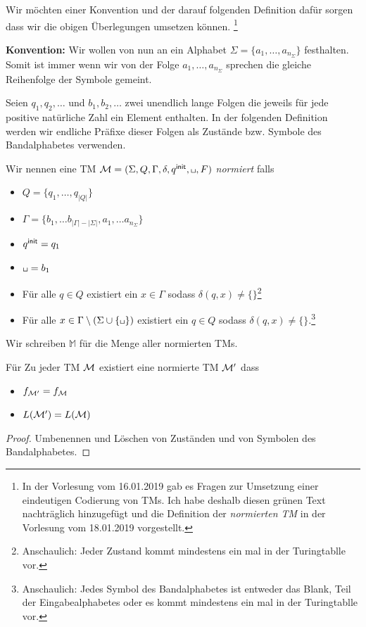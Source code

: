 {\color{green!50!black}
	Wir möchten einer Konvention und der darauf folgenden Definition dafür sorgen dass wir die obigen Überlegungen umsetzen können.
	\footnote{In der Vorlesung vom 16.01.2019 gab es Fragen zur Umsetzung einer eindeutigen Codierung von \acp{TM}.
		Ich habe deshalb diesen grünen Text nachträglich hinzugefügt und die Definition der \emph{normierten \ac{TM}} in der Vorlesung vom 18.01.2019 vorgestellt.}
	
	\textbf{Konvention: } 
	Wir wollen von nun an ein Alphabet $\Sigma=\{a_1,\ldots, a_{n_\Sigma}\}$ festhalten.
	Somit ist immer wenn wir von der Folge $a_1,\ldots, a_{n_\Sigma}$ sprechen die gleiche Reihenfolge der Symbole gemeint.
	
	
	Seien $q_1,q_2,\ldots$ und $b_1,b_2,\ldots$ zwei unendlich lange Folgen die jeweils für jede positive natürliche Zahl ein Element enthalten.
	In der folgenden Definition werden wir endliche Präfixe dieser Folgen als Zustände bzw. Symbole des Bandalphabetes verwenden.
	
	\begin{Def}[name={[normierte \ac{TM}]}]\label{def:normTM}
		Wir nennen eine \ac{TM} $\M=(\Sigma, Q, \Gamma, \delta, \qinit, \blank, F)$  \emph{normiert} falls
		\begin{itemize}
			\item $Q=\{q_1,\ldots, q_{|Q|}\}$
			\item $\Gamma=\{b_1,\ldots b_{|\Gamma|-|\Sigma|}, a_1,\ldots a_{n_\Sigma}\}$
			\item $q^\mathsf{init} = q_1$
			\item $\blank = b_1$
			\item Für alle $q\in Q$ existiert ein $x\in\Gamma$ sodass $\delta(q,x)\neq\{\}$\footnote{
				Anschaulich: Jeder Zustand kommt mindestens ein mal in der Turingtablle vor.}
			\item Für alle $x\in\Gamma\setminus(\Sigma\cup\{\mblank\})$ existiert ein $q\in Q$ sodass $\delta(q,x)\neq\{\}$.\footnote{
				Anschaulich: Jedes Symbol des Bandalphabetes ist entweder das Blank, Teil der Eingabealphabetes oder es kommt mindestens ein mal in der Turingtablle vor.}
		\end{itemize}
		Wir schreiben $\mathbb{M}$ für die Menge aller normierten \ac{TM}s.
	\end{Def}
	
	
	
	\begin{lemma}[name={[normierte \ac{TM}]}]\label{lem:normTM}
		Für Zu jeder TM $\mathcal{M}$ existiert eine normierte TM $\mathcal{M}'$ dass
		\begin{itemize}
			\item $f_{\mathcal{M}'}=f_{\mathcal{M}}$
			\item $L(\mathcal{M}')=L(\mathcal{M})$
		\end{itemize}
	\end{lemma}
	\begin{proof}
		Umbenennen und Löschen von Zuständen und von Symbolen des Bandalphabetes.
	\end{proof}
}



